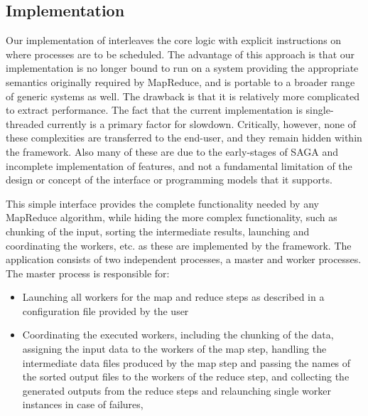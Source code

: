 \documentclass[3p,twocolumn]{elsarticle}
\begin{document}

\subsection{\sagamapreduce Implementation}

Our implementation of \sagamapreduce interleaves the core logic with
explicit instructions on where processes are to be scheduled.  The
advantage of this approach is that our implementation is no longer
bound to run on a system providing the appropriate semantics
originally required by MapReduce, and is portable to a broader range
of generic systems as well.  The drawback is that it is relatively
more complicated to extract performance.%
The fact that the current implementation is single-threaded
currently is a primary factor for slowdown.  Critically, however, none
of these complexities are transferred to the end-user, and they remain
hidden within the framework. Also many of these are due to the
early-stages of SAGA and incomplete implementation of features, and
not a fundamental limitation of the design or concept of the interface
or programming models that it supports.

This simple interface provides the complete functionality needed by
any MapReduce algorithm, while hiding the more complex functionality,
such as chunking of the input, sorting the intermediate results,
launching and coordinating the workers, etc. as these are implemented
by the framework.  The application consists of two independent
processes, a master and worker processes. The master process is
responsible for:

\begin{itemize}
\item Launching all workers for the map and reduce steps as described
  in a configuration file provided by the user 
\item Coordinating the executed workers, including the chunking of the
  data, assigning the input data to the workers of the map step,
  handling the intermediate data files produced by the map step and
  passing the names of the sorted output files to the workers of the
  reduce step, and collecting the generated outputs from the reduce
  steps and relaunching single worker instances in case of failures,
\end{itemize}
\end{document}
